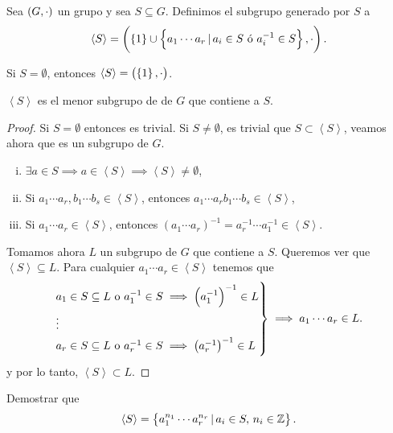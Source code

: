 \begin{defi}
        Sea $\left( G, \cdot\right)$ un grupo y sea $S\subseteq G$. Definimos el subgrupo generado por $S$ a
        \[
            \left<S\right> = \left( \left\{ 1 \right\} \cup \left\{a_1 \cdots a_r \,\vert\, a_i \in S \text{ ó } a^{-1}_i \in S\right\}, \cdot \right).
        \]
\end{defi}

\begin{obs}
    Si $S = \emptyset$, entonces $\left<S\right> = \left( \left\{1\right\}, \cdot \right)$.
\end{obs}

\begin{obs}
    $\left<S\right>$ es el menor subgrupo de de $G$ que contiene a $S$.
\end{obs}

\begin{proof}
    Si $S = \emptyset$ entonces es trivial.
    Si $S \neq \emptyset$, es trivial que $S \subset \left<S\right>$, veamos ahora que es un subgrupo de $G$.
    \begin{enumerate}[i)]
        \item $\exists a \in S \implies a \in \left<S\right> \implies \left<S\right> \neq \emptyset$,
        \item Si $a_1\cdots a_r, b_1 \cdots b_s \in \left<S\right>$, entonces $a_1 \cdots a_r b_1 \cdots b_s \in \left<S\right>$,
        \item Si $a_1 \cdots a_r \in \left<S\right>$, entonces $\left( a_1 \cdots a_r \right)^{-1} =
            a^{-1}_r \cdots a^{-1}_1 \in \left<S\right>$.
    \end{enumerate}
    Tomamos ahora $L$ un subgrupo de $G$ que contiene a $S$. Queremos ver que $\left<S\right> \subseteq L$.
    Para cualquier $a_1 \cdots a_r \in \left<S\right>$ tenemos que
    \[
        \begin{rcases}
            a_1 \in S \subseteq L \text{ o } a^{-1}_1 \in S \implies \left( a^{-1}_1 \right)^{-1} \in L\\
            \vdots \\
            a_r \in S \subseteq L\text{ o } a^{-1}_r \in S \implies \left( a^{-1}_r \right)^{-1} \in L
        \end{rcases}
        \implies a_1 \cdots a_r \in L.
    \]
    y por lo tanto, $\left<S\right> \subset L$.
\end{proof}

\begin{ej}
    Demostrar que
    \[
        \left<S\right> = \left\{a^{n_1}_1 \cdots a^{n_r}_r \,\vert\, a_i \in S, \, n_i \in \mathbb{Z}\right\}.
    \]
\end{ej}

